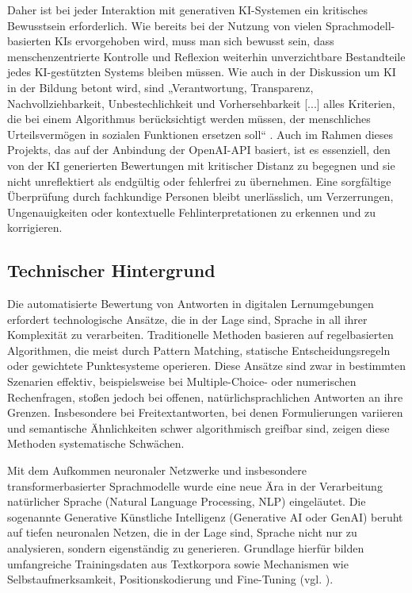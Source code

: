 \documentclass[a4paper,12pt]{article}
\begin{document}
Daher ist bei jeder Interaktion mit generativen KI-Systemen ein kritisches Bewusstsein erforderlich. Wie bereits bei der Nutzung von vielen Sprachmodell-basierten KIs ervorgehoben wird, muss man sich bewusst sein, dass menschenzentrierte Kontrolle und Reflexion weiterhin unverzichtbare Bestandteile jedes KI-gestützten Systems bleiben müssen. Wie auch in der Diskussion um KI in der Bildung betont wird, sind „Verantwortung, Transparenz, Nachvollziehbarkeit, Unbestechlichkeit und Vorhersehbarkeit [...] alles Kriterien, die bei einem Algorithmus berücksichtigt werden müssen, der menschliches Urteilsvermögen in sozialen Funktionen ersetzen soll“ \parencite[39]{luckin}. Auch im Rahmen dieses Projekts, das auf der Anbindung der OpenAI-API basiert, ist es essenziell, den von der KI generierten Bewertungen mit kritischer Distanz zu begegnen und sie nicht unreflektiert als endgültig oder fehlerfrei zu übernehmen. Eine sorgfältige Überprüfung durch fachkundige Personen bleibt unerlässlich, um Verzerrungen, Ungenauigkeiten oder kontextuelle Fehlinterpretationen zu erkennen und zu korrigieren. \parencite{luckin}

\newpage

\subsection{Technischer Hintergrund}
Die automatisierte Bewertung von Antworten in digitalen Lernumgebungen erfordert technologische Ansätze, die in der Lage sind, Sprache in all ihrer Komplexität zu verarbeiten. Traditionelle Methoden basieren auf regelbasierten Algorithmen, die meist durch Pattern Matching, statische Entscheidungsregeln oder gewichtete Punktesysteme operieren. Diese Ansätze sind zwar in bestimmten Szenarien effektiv, beispielsweise bei Multiple-Choice- oder numerischen Rechenfragen, stoßen jedoch bei offenen, natürlichsprachlichen Antworten an ihre Grenzen. Insbesondere bei Freitextantworten, bei denen Formulierungen variieren und semantische Ähnlichkeiten schwer algorithmisch greifbar sind, zeigen diese Methoden systematische Schwächen.

Mit dem Aufkommen neuronaler Netzwerke und insbesondere transformerbasierter Sprachmodelle wurde eine neue Ära in der Verarbeitung natürlicher Sprache (Natural Language Processing, NLP) eingeläutet. Die sogenannte Generative Künstliche Intelligenz (Generative AI oder GenAI) beruht auf tiefen neuronalen Netzen, die in der Lage sind, Sprache nicht nur zu analysieren, sondern eigenständig zu generieren. Grundlage hierfür bilden umfangreiche Trainingsdaten aus Textkorpora sowie Mechanismen wie Selbstaufmerksamkeit, Positionskodierung und Fine-Tuning (vgl.  \textcite{radford}).
\end{document}
